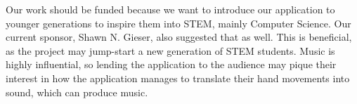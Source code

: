 Our work should be funded because we want to introduce our application to younger generations to inspire them into STEM, mainly Computer Science. Our current sponsor, Shawn N. Gieser, also suggested that as well. This is beneficial, as the project may jump-start a new generation of STEM students. Music is highly influential, so lending the application to the audience may pique their interest in how the application manages to translate their hand movements into sound, which can produce music. 